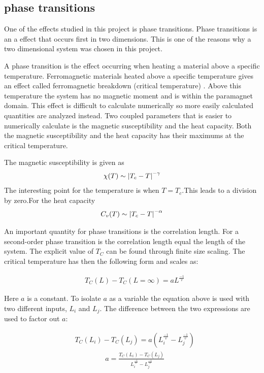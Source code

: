 \subsection{phase transitions}

One of the effects studied in this project is phase transitions. Phase transitions is an a effect that occurs first in two dimensions. This is one of the reasons why a two dimensional system was chosen in this project.

A phase transition is the effect occurring when heating a material above a specific temperature. Ferromagnetic materials heated above a specific temperature gives an effect called ferromagnetic breakdown (critical temperature) \cite{ferromagnetism}. Above this temperature the system has no magnetic moment and is within the paramagnet domain. This effect is difficult to calculate numerically so more easily calculated quantities are analyzed instead. Two coupled parameters that is easier to numerically calculate is the magnetic susceptibility and the heat capacity. Both the magnetic susceptibility and the heat capacity has their maximums at the critical temperature.

The magnetic susceptibility is given as\cite{compphys} 
\begin{align}
	\chi(T)\sim\abs{T_c-T}^{-\gamma}
\end{align}
The interesting point for the temperature is when $T=T_c$.This leads to a division by zero.For the heat capacity
\begin{align*}
	C_v(T)\sim\abs{T_c-T}^{-\alpha}
\end{align*}

An important quantity for phase transitions is the correlation length. For a second-order phase transition is the correlation length equal the length of the system. The explicit value of $T_C$ can be found through finite size scaling. The critical temperature has then the following form and scales as:

\begin{align}
&T_C (L) - T_C (L=\infty) = a L^{\frac{-1}{v}}
\label{eq:tc}
\end{align}

Here $a$ is a constant. To isolate $a$ as a variable the equation above is used with two different inputs, $L_i$ and $L_j$. The difference between the two expressions are used to factor out $a$:


\begin{align*}
&T_C (L_i) - T_C (L_j) = a 
\left(
L_i^{\frac{-1}{v}}-L_j^{\frac{-1}{v}}
\right)
\end{align*}
\begin{align}
&a = 
\frac{T_C (L_i) - T_C (L_j)} 
{
	L_i^{\frac{-1}{v}}-L_j^{\frac{-1}{v}}
} \label{eq:find-a}
\end{align}

